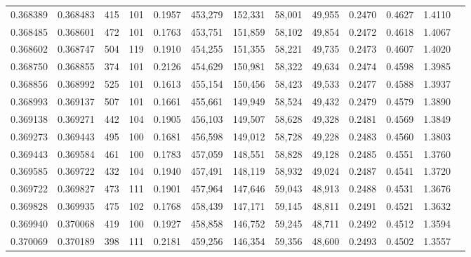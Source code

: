 \begin{tabular}{rrrrrrrrrrrrr}
0.368389 & 0.368483 &   415 & 101 &                                     0.1957 & 453,279 & 152,331 &  58,001 &  49,955 & 0.2470 & 0.4627 & 1.4110 \\
0.368485 & 0.368601 &   472 & 101 &                                     0.1763 & 453,751 & 151,859 &  58,102 &  49,854 & 0.2472 & 0.4618 & 1.4067 \\
0.368602 & 0.368747 &   504 & 119 &                                     0.1910 & 454,255 & 151,355 &  58,221 &  49,735 & 0.2473 & 0.4607 & 1.4020 \\
0.368750 & 0.368855 &   374 & 101 &                                     0.2126 & 454,629 & 150,981 &  58,322 &  49,634 & 0.2474 & 0.4598 & 1.3985 \\
0.368856 & 0.368992 &   525 & 101 &                                     0.1613 & 455,154 & 150,456 &  58,423 &  49,533 & 0.2477 & 0.4588 & 1.3937 \\
0.368993 & 0.369137 &   507 & 101 &                                     0.1661 & 455,661 & 149,949 &  58,524 &  49,432 & 0.2479 & 0.4579 & 1.3890 \\
0.369138 & 0.369271 &   442 & 104 &                                     0.1905 & 456,103 & 149,507 &  58,628 &  49,328 & 0.2481 & 0.4569 & 1.3849 \\
0.369273 & 0.369443 &   495 & 100 &                                     0.1681 & 456,598 & 149,012 &  58,728 &  49,228 & 0.2483 & 0.4560 & 1.3803 \\
0.369443 & 0.369584 &   461 & 100 &                                     0.1783 & 457,059 & 148,551 &  58,828 &  49,128 & 0.2485 & 0.4551 & 1.3760 \\
0.369585 & 0.369722 &   432 & 104 &                                     0.1940 & 457,491 & 148,119 &  58,932 &  49,024 & 0.2487 & 0.4541 & 1.3720 \\
0.369722 & 0.369827 &   473 & 111 &                                     0.1901 & 457,964 & 147,646 &  59,043 &  48,913 & 0.2488 & 0.4531 & 1.3676 \\
0.369828 & 0.369935 &   475 & 102 &                                     0.1768 & 458,439 & 147,171 &  59,145 &  48,811 & 0.2491 & 0.4521 & 1.3632 \\
0.369940 & 0.370068 &   419 & 100 &                                     0.1927 & 458,858 & 146,752 &  59,245 &  48,711 & 0.2492 & 0.4512 & 1.3594 \\
0.370069 & 0.370189 &   398 & 111 &                                     0.2181 & 459,256 & 146,354 &  59,356 &  48,600 & 0.2493 & 0.4502 & 1.3557 \\

\end{tabular}
